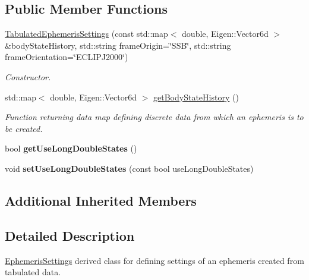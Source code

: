 \subsection*{Public Member Functions}
\begin{DoxyCompactItemize}
\item 
\hyperlink{classtudat_1_1simulation__setup_1_1TabulatedEphemerisSettings_a1f3fbe7fd3d4b73a5044c9f35ef671ec}{Tabulated\+Ephemeris\+Settings} (const std\+::map$<$ double, Eigen\+::\+Vector6d $>$ \&body\+State\+History, std\+::string frame\+Origin=\char`\"{}S\+SB\char`\"{}, std\+::string frame\+Orientation=\char`\"{}E\+C\+L\+I\+P\+J2000\char`\"{})
\begin{DoxyCompactList}\small\item\em Constructor. \end{DoxyCompactList}\item 
std\+::map$<$ double, Eigen\+::\+Vector6d $>$ \hyperlink{classtudat_1_1simulation__setup_1_1TabulatedEphemerisSettings_a3520d3144676b27dc2d3d59a7c3dfc87}{get\+Body\+State\+History} ()
\begin{DoxyCompactList}\small\item\em Function returning data map defining discrete data from which an ephemeris is to be created. \end{DoxyCompactList}\item 
bool {\bfseries get\+Use\+Long\+Double\+States} ()\hypertarget{classtudat_1_1simulation__setup_1_1TabulatedEphemerisSettings_a4a76cb8afce8ed3179d0b179b11a319d}{}\label{classtudat_1_1simulation__setup_1_1TabulatedEphemerisSettings_a4a76cb8afce8ed3179d0b179b11a319d}

\item 
void {\bfseries set\+Use\+Long\+Double\+States} (const bool use\+Long\+Double\+States)\hypertarget{classtudat_1_1simulation__setup_1_1TabulatedEphemerisSettings_a4b8c6d55e61196d6004c34c05503309a}{}\label{classtudat_1_1simulation__setup_1_1TabulatedEphemerisSettings_a4b8c6d55e61196d6004c34c05503309a}

\end{DoxyCompactItemize}
\subsection*{Additional Inherited Members}


\subsection{Detailed Description}
\hyperlink{classtudat_1_1simulation__setup_1_1EphemerisSettings}{Ephemeris\+Settings} derived class for defining settings of an ephemeris created from tabulated data.

